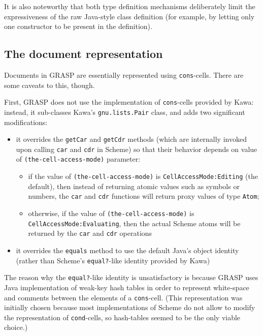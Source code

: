 \documentclass[sigconf]{acmart}
\begin{document}
It is also noteworthy that both type definition mechanisms
deliberately limit the expressiveness of the raw Java-style
class definition (for example, by letting only one constructor
to be present in the definition).

\subsection{The document representation}

Documents in GRASP are essentially represented
using \texttt{cons}-cells. There are some caveats to this, though.

First, GRASP does not use the implementation of \texttt{cons}-cells
provided by Kawa: instead, it sub-classes Kawa's \texttt{gnu\-.lists\-.Pair}
class, and adds two significant modifications:
\begin{itemize}
\item it overrides the \texttt{getCar} and \texttt{getCdr} methods (which are
internally invoked upon calling \texttt{car} and \texttt{cdr} in Scheme)
so that their behavior depends on value of \texttt{(the-cell-access-mode)}
parameter:
\begin{itemize}
\item if the value of \texttt{(the-cell-access-mode)} is
\texttt{Cell\-Access\-Mode\-:Editing} (the default), then
instead of returning atomic values such as symbols or numbers, 
the \texttt{car} and \texttt{cdr} functions will return proxy 
values of type \texttt{Atom};
\item otherwise, if the value of \texttt{(the-cell-access-mode)}
is \texttt{Cell\-Access\-Mode\-:Evaluating}, then the actual
Scheme atoms will be returned by the \texttt{car} and \texttt{cdr}
operations
\end{itemize}
\item it overrides the \texttt{equals} method to use the default Java's
object identity (rather than Scheme's \texttt{equal?}-like
identity provided by Kawa)
\end{itemize}

The reason why the \texttt{equal?}-like identity is unsatisfactory
is because GRASP uses Java implementation of weak-key
hash tables in order to represent white-space and comments
between the elements of a \texttt{cons}-cell. (This
representation was initially chosen because most implementations
of Scheme do not allow to modify the representation of 
\texttt{cond}-cells, so hash-tables seemed to be the only
viable choice.)
\end{document}
